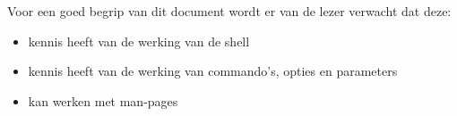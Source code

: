 Voor een goed begrip van dit document wordt er van de lezer verwacht dat deze:
\begin{itemize}
\item kennis heeft van de werking van de shell
\item kennis heeft van de werking van commando's, opties en parameters
\item kan werken met man-pages
\end{itemize}
